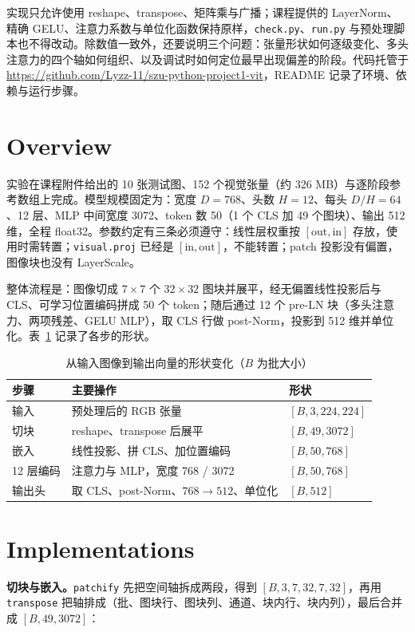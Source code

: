 \documentclass[a4paper,12pt]{article}
\begin{document}
实现只允许使用 reshape、transpose、矩阵乘与广播；课程提供的 LayerNorm、精确 GELU、注意力系数与单位化函数保持原样，\texttt{check.py}、\texttt{run.py} 与预处理脚本也不得改动。除数值一致外，还要说明三个问题：张量形状如何逐级变化、多头注意力的四个轴如何组织、以及调试时如何定位最早出现偏差的阶段。代码托管于 \url{https://github.com/Lyzz-11/szu-python-project1-vit}，README 记录了环境、依赖与运行步骤。

\section{Overview}

实验在课程附件给出的 10 张测试图、152 个视觉张量（约 326 MB）与逐阶段参考数组上完成。模型规模固定为：宽度 $D=768$、头数 $H=12$、每头 $D/H=64$、12 层、MLP 中间宽度 3072、token 数 50（1 个 CLS 加 49 个图块）、输出 512 维，全程 float32。参数约定有三条必须遵守：线性层权重按 $[\mathrm{out},\mathrm{in}]$ 存放，使用时需转置；\texttt{visual.proj} 已经是 $[\mathrm{in},\mathrm{out}]$，不能转置；patch 投影没有偏置，图像块也没有 LayerScale。

整体流程是：图像切成 $7\times7$ 个 $32\times32$ 图块并展平，经无偏置线性投影后与 CLS、可学习位置编码拼成 50 个 token；随后通过 12 个 pre-LN 块（多头注意力、两项残差、GELU MLP），取 CLS 行做 post-Norm，投影到 512 维并单位化。表~\ref{tab:flow} 记录了各步的形状。

\begin{table}[H]
\centering
\caption{从输入图像到输出向量的形状变化（$B$ 为批大小）}
\label{tab:flow}
\small
\begin{tabular}{|l|l|l|}
\hline
步骤 & 主要操作 & 形状 \\
\hline
输入 & 预处理后的 RGB 张量 & $[B,3,224,224]$ \\
切块 & reshape、transpose 后展平 & $[B,49,3072]$ \\
嵌入 & 线性投影、拼 CLS、加位置编码 & $[B,50,768]$ \\
12 层编码 & 注意力与 MLP，宽度 768 / 3072 & $[B,50,768]$ \\
输出头 & 取 CLS、post-Norm、$768\rightarrow512$、单位化 & $[B,512]$ \\
\hline
\end{tabular}
\end{table}

\section{Implementations}

\textbf{切块与嵌入。}\texttt{patchify} 先把空间轴拆成两段，得到 $[B,3,7,32,7,32]$，再用 \texttt{transpose} 把轴排成（批、图块行、图块列、通道、块内行、块内列），最后合并成 $[B,49,3072]$：
\end{document}
